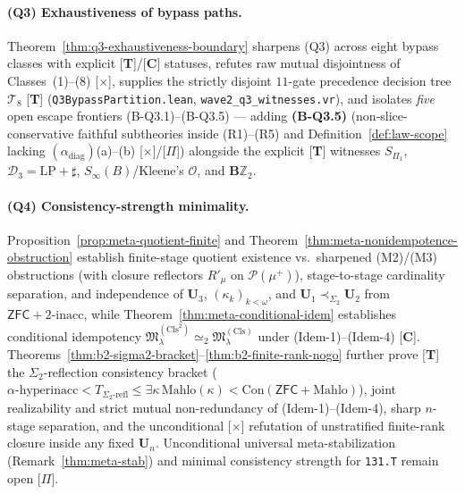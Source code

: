 \documentclass[11pt]{article}
\theoremstyle{plain}
\theoremstyle{definition}
\newcommand{\fM}{\mathfrak{M}}
\newcommand{\Con}{\mathrm{Con}}
\newcommand{\ZFC}{\mathsf{ZFC}}
\begin{document}
\paragraph{(Q3) Exhaustiveness of bypass paths.} Theorem~\ref{thm:q3-exhaustiveness-boundary} sharpens (Q3) across eight bypass classes with explicit \textup{[\textbf{T}]}/\textup{[\textbf{C}]} statuses, refutes raw mutual disjointness of Classes~(1)--(8) \textup{[\textbf{$\times$}]}, supplies the strictly disjoint $11$-gate precedence decision tree $\mathcal{T}_8$ \textup{[\textbf{T}]} (\texttt{Q3BypassPartition.lean}, \texttt{wave2\_q3\_witnesses.vr}), and isolates \emph{five} open escape frontiers \textup{(B-Q3.1)--(B-Q3.5)} --- adding \textbf{(B-Q3.5)} (non-slice-conservative faithful subtheories inside (R1)--(R5) and Definition~\ref{def:law-scope} lacking $(\alpha_{\mathrm{diag}})$(a)--(b) \textup{[\textbf{$\times$}]/[\textbf{$\Pi$}]}) alongside the explicit \textup{[\textbf{T}]} witnesses $S_{\Pi_1}$, $\mathcal{D}_3 = \mathrm{LP} + \sharp$, $S_\infty(B)$/Kleene's $\mathcal{O}$, and $\mathbf{B}\mathbb{Z}_2$.

\paragraph{(Q4) Consistency-strength minimality.} Proposition~\ref{prop:meta-quotient-finite} and Theorem~\ref{thm:meta-nonidempotence-obstruction} establish finite-stage quotient existence vs.\ sharpened (M2)/(M3) obstructions (with closure reflectors $R'_\mu$ on $\mathcal{P}(\mu^+)$), stage-to-stage cardinality separation, and independence of $\mathbf{U}_3$, $(\kappa_k)_{k<\omega}$, and $\mathbf{U}_1 \prec_{\Sigma_2} \mathbf{U}_2$ from $\ZFC + 2\text{-inacc}$, while Theorem~\ref{thm:meta-conditional-idem} establishes conditional idempotency $\fM^{(\mathrm{Cls}^2)}_\lambda \simeq_2 \fM^{(\mathrm{Cls})}_\lambda$ under (Idem-1)--(Idem-4) \textup{[\textbf{C}]}. Theorems~\ref{thm:b2-sigma2-bracket}--\ref{thm:b2-finite-rank-nogo} further prove \textup{[\textbf{T}]} the $\Sigma_2$-reflection consistency bracket ($\alpha\text{-hyperinacc} < T_{\Sigma_2\text{-refl}} \le \exists\kappa\,\mathrm{Mahlo}(\kappa) < \Con(\ZFC+\text{Mahlo})$), joint realizability and strict mutual non-redundancy of (Idem-1)--(Idem-4), sharp $n$-stage separation, and the unconditional \textup{[\textbf{$\times$}]} refutation of unstratified finite-rank closure inside any fixed $\mathbf{U}_n$. Unconditional universal meta-stabilization (Remark~\ref{thm:meta-stab}) and minimal consistency strength for \texttt{131.T} remain open \textup{[\textbf{$\Pi$}]}.
\end{document}
